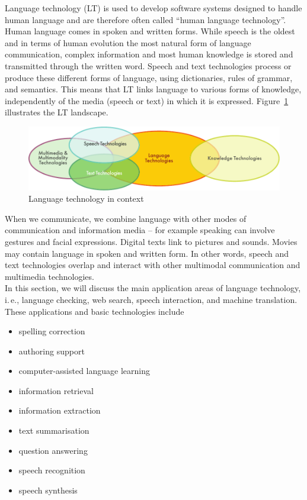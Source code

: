 \documentclass[]{../metanetpaper}
\begin{document}
\begin{multicols}{2}

Language technology (LT) is used to develop software systems designed to handle human language and are therefore often called “human language technology”. Human language comes in spoken and written forms. While speech is the oldest and in terms of human evolution the most natural form of language communication, complex information and most human knowledge is stored and transmitted through the written word. Speech and text technologies process or produce these different forms of language, using dictionaries, rules of grammar, and semantics. This means that LT links language to various forms of knowledge, independently of the media (speech or text) in which it is expressed. Figure~\ref{fig:ltincontext_en} illustrates the LT landscape.

\begin{figure}[htb]
  \center
  \includegraphics[width=\textwidth]{../_media/english/language_technologies}
  \caption{Language technology in context}
  \label{fig:ltincontext_en}
\end{figure}

When we communicate, we combine language with other modes of communication and information media – for example speaking can involve gestures and facial expressions. Digital texts link to pictures and sounds. Movies may contain language in spoken and written form. In other words, speech and text technologies overlap and interact with other multimodal communication and multimedia technologies.\\ 

In this section, we will discuss the main application areas of language technology, i.\,e., language checking, web search, speech interaction, and machine translation. These applications and basic technologies include 

\begin{itemize}
\item spelling correction
\item authoring support
\item computer-assisted language learning
\item information retrieval 
\item information extraction
\item text summarisation
\item question answering
\item speech recognition 
\item speech synthesis 
\end{itemize}


\end{multicols}
\end{document}
